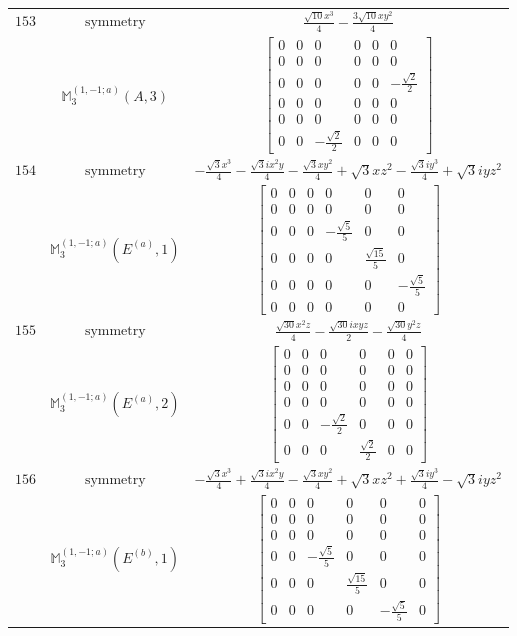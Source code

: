 \documentclass[fleqn,8pt,landscape]{jsarticle}
\begin{document}
\begin{longtable}{ccc}
$ 153 $ & $ \text{symmetry} $ & $ \frac{\sqrt{10} x^{3}}{4} - \frac{3 \sqrt{10} x y^{2}}{4} $ \\
$  $ & $ \mathbb{M}_{3}^{(1,-1;a)}(A,3) $ & $ \begin{bmatrix} 0 & 0 & 0 & 0 & 0 & 0 \\ 0 & 0 & 0 & 0 & 0 & 0 \\ 0 & 0 & 0 & 0 & 0 & - \frac{\sqrt{2}}{2} \\ 0 & 0 & 0 & 0 & 0 & 0 \\ 0 & 0 & 0 & 0 & 0 & 0 \\ 0 & 0 & - \frac{\sqrt{2}}{2} & 0 & 0 & 0 \end{bmatrix} $ \\ \hline
$ 154 $ & $ \text{symmetry} $ & $ - \frac{\sqrt{3} x^{3}}{4} - \frac{\sqrt{3} i x^{2} y}{4} - \frac{\sqrt{3} x y^{2}}{4} + \sqrt{3} x z^{2} - \frac{\sqrt{3} i y^{3}}{4} + \sqrt{3} i y z^{2} $ \\
$  $ & $ \mathbb{M}_{3}^{(1,-1;a)}(E^{(a)},1) $ & $ \begin{bmatrix} 0 & 0 & 0 & 0 & 0 & 0 \\ 0 & 0 & 0 & 0 & 0 & 0 \\ 0 & 0 & 0 & - \frac{\sqrt{5}}{5} & 0 & 0 \\ 0 & 0 & 0 & 0 & \frac{\sqrt{15}}{5} & 0 \\ 0 & 0 & 0 & 0 & 0 & - \frac{\sqrt{5}}{5} \\ 0 & 0 & 0 & 0 & 0 & 0 \end{bmatrix} $ \\ \hline
$ 155 $ & $ \text{symmetry} $ & $ \frac{\sqrt{30} x^{2} z}{4} - \frac{\sqrt{30} i x y z}{2} - \frac{\sqrt{30} y^{2} z}{4} $ \\
$  $ & $ \mathbb{M}_{3}^{(1,-1;a)}(E^{(a)},2) $ & $ \begin{bmatrix} 0 & 0 & 0 & 0 & 0 & 0 \\ 0 & 0 & 0 & 0 & 0 & 0 \\ 0 & 0 & 0 & 0 & 0 & 0 \\ 0 & 0 & 0 & 0 & 0 & 0 \\ 0 & 0 & - \frac{\sqrt{2}}{2} & 0 & 0 & 0 \\ 0 & 0 & 0 & \frac{\sqrt{2}}{2} & 0 & 0 \end{bmatrix} $ \\ \hline
$ 156 $ & $ \text{symmetry} $ & $ - \frac{\sqrt{3} x^{3}}{4} + \frac{\sqrt{3} i x^{2} y}{4} - \frac{\sqrt{3} x y^{2}}{4} + \sqrt{3} x z^{2} + \frac{\sqrt{3} i y^{3}}{4} - \sqrt{3} i y z^{2} $ \\
$  $ & $ \mathbb{M}_{3}^{(1,-1;a)}(E^{(b)},1) $ & $ \begin{bmatrix} 0 & 0 & 0 & 0 & 0 & 0 \\ 0 & 0 & 0 & 0 & 0 & 0 \\ 0 & 0 & 0 & 0 & 0 & 0 \\ 0 & 0 & - \frac{\sqrt{5}}{5} & 0 & 0 & 0 \\ 0 & 0 & 0 & \frac{\sqrt{15}}{5} & 0 & 0 \\ 0 & 0 & 0 & 0 & - \frac{\sqrt{5}}{5} & 0 \end{bmatrix} $ \\ \hline

\end{longtable}
\end{document}
